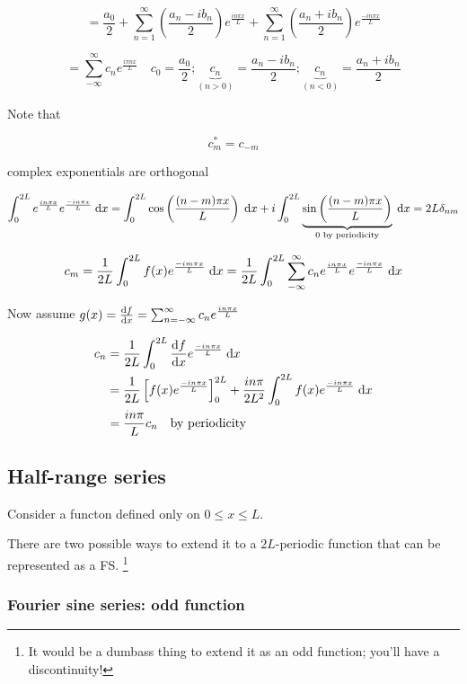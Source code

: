 \documentclass[a4paper]{article}
\begin{document}
\[ = \frac{a_{0}}{2} + \sum_{n=1}^{\infty} \left( \frac{a_{n} - i b_{n}}{2} \right) e^{\frac{i n \pi x}{L}} + \sum_{n=1}^{\infty} \left( \frac{a_{n} + i b_{n}}{2} \right) e^{\frac{- i n \pi x}{L}}  \]

\[ = \sum_{-\infty}^{\infty} c_{n} e^{\frac{i \pi n x}{L}} \quad c_{0} = \frac{a_{0}}{2} ; \underbrace{c_{n}}_{ (n > 0)} = \frac{a_{n} - i b_{n}}{2}; \underbrace{c_{n}}_{ (n < 0)} = \frac{a_{n} + i b_{n}}{2} \]

Note that 

\[ c_{m}^{*} = c_{-m} \]

complex exponentials are orthogonal

\[ \int_{0}^{2L} e^{\frac{i n \pi x}{L}} e ^{\frac{- i n \pi x}{L}} \; \mathrm{d} x = \int_{0}^{2L} \cos \left( \frac{(n - m) \pi x}{L} \right)  \; \mathrm{d} x  + i \int_{0}^{2L}  \underbrace{\sin \left( \frac{(n-m)\pi x}{L} \right) }_{0 \text{ by periodicity}} \; \mathrm{d} x = 2L \delta_{nm} \]


\[ c_{m} = \frac{1}{2L} \int_{0}^{2L} f(x) e^{\frac{-i m \pi x}{L}} \; \mathrm{d} x = \frac{1}{2L} \int_{0}^{2L} \sum_{-\infty}^{\infty} c_{n} e^{\frac{i n \pi x}{L}} e ^{\frac{- i n \pi x}{L}} \; \mathrm{d} x \]

Now assume $ g(x) = \frac{\mathrm{d} f}{\mathrm{d} x} = \sum_{n = -\infty}^{\infty} c_{n} e^{\frac{i n \pi x}{L}} $


\begin{align*}
	c_{n} & = \frac{1}{2L} \int_{0}^{2L} \frac{\mathrm{d} f}{\mathrm{d} x} e^{\frac{- i n \pi x}{L}} \; \mathrm{d} x \\
	& = \frac{1}{2L} \left[  f(x) e^{\frac{- i n \pi x }{L}} \right]_{0}^{2L} + \frac{i n \pi}{2L^{2}} \int_{0}^{2L} f(x) e^{\frac{- i n \pi x}{L}} \; \mathrm{d} x \\
	& = \frac{i n \pi}{L} c_{n} \quad \text{by periodicity}
\end{align*}

\subsection{Half-range series}

Consider a functon defined only on $ 0 \leq x \leq L $.

There are two possible ways to extend it to a $ 2L $-periodic function that can be represented as a FS. \footnote{It would be a dumbass thing to extend it as an odd function; you'll have a discontinuity!}

\subsubsection{Fourier sine series: odd function}
\end{document}
